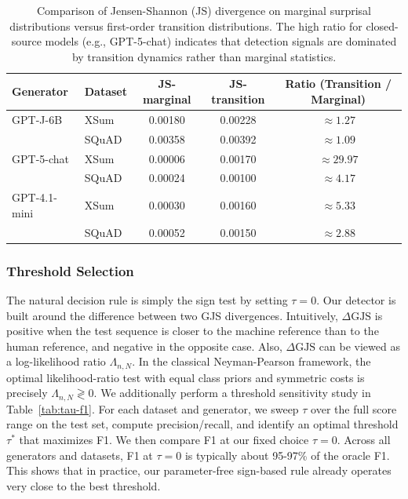 \documentclass{article}
\theoremstyle{plain}
\theoremstyle{definition}
\theoremstyle{remark}
\begin{document}
\begin{table}[htbp]
\centering


{\scriptsize
\begin{tabular}{llccc}
\toprule
\textbf{Generator} & \textbf{Dataset} & \textbf{JS-marginal} & \textbf{JS-transition} & \textbf{Ratio (Transition / Marginal)} \\
\midrule
GPT-J-6B     & XSum  & 0.00180   & 0.00228 & $\approx 1.27$ \\
   & SQuAD & 0.00358   & 0.00392 & $\approx 1.09$ \\
\midrule
GPT-5-chat   & XSum  & 0.00006   & 0.00170 & $\mathbf{\approx 29.97}$ \\
  & SQuAD & 0.00024   & 0.00100 & $\approx 4.17$ \\
\midrule
GPT-4.1-mini & XSum  & 0.00030   & 0.00160 & $\approx 5.33$ \\
& SQuAD & 0.00052   & 0.00150 & $\approx 2.88$ \\
\bottomrule
\end{tabular}}

\caption{Comparison of Jensen-Shannon (JS) divergence on marginal surprisal distributions versus first-order transition distributions. The high ratio for closed-source models (e.g., GPT-5-chat) indicates that detection signals are dominated by transition dynamics rather than marginal statistics.}
\label{tab:marginal_vs_transition}
\end{table}



\subsubsection{\quad Threshold Selection} \label{app:threshold}
The natural decision rule is simply the sign test by setting $\tau=0$. Our detector is built around the difference between two GJS divergences. Intuitively, $\Delta \text{GJS}$ is positive when the test sequence is closer to the machine reference than to the human reference, and negative in the opposite case. Also, $\Delta \text{GJS}$ can be viewed as a log-likelihood ratio $\Lambda_{n,N}$. In the classical Neyman-Pearson framework, the optimal likelihood-ratio test with equal class priors and symmetric costs is precisely $\Lambda_{n,N} \gtrless 0$. We additionally perform a threshold sensitivity study in Table~\ref{tab:tau-f1}. For each dataset and generator, we sweep $\tau$ over the full score range on the test set, compute precision/recall, and identify an optimal threshold $\tau^*$ that maximizes F1. We then compare F1 at our fixed choice $\tau=0$. Across all generators and datasets, F1 at $\tau=0$ is typically about 95-97\% of the oracle F1. This shows that in practice, our parameter-free sign-based rule already operates very close to the best threshold.
\end{document}
